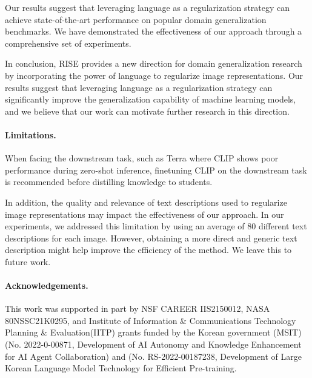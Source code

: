 \documentclass[10pt,twocolumn,letterpaper]{article}
\newcommand{\name}{{\color{black} RISE}}
\begin{document}
Our results suggest that leveraging language as a regularization strategy can achieve state-of-the-art performance on popular domain generalization benchmarks. We have demonstrated the effectiveness of our approach through a comprehensive set of experiments. 

In conclusion, \name{} provides a new direction for domain generalization research by incorporating the power of language to regularize image representations. Our results suggest that leveraging language as a regularization strategy can significantly improve the generalization capability of machine learning models, and we believe that our work can motivate further research in this direction.

\vspace{-10pt}
\paragraph{Limitations.} When facing the downstream task, such as Terra where CLIP shows poor performance during zero-shot inference, finetuning CLIP on the downstream task is recommended before distilling knowledge to students.

In addition, the quality and relevance of text descriptions used to regularize image representations may impact the effectiveness of our approach. In our experiments, we addressed this limitation by using an average of 80 different text descriptions for each image.  However, obtaining a more direct and generic text description might help improve the efficiency of the method.  We leave this to future work. 
\vspace{-10pt}
\paragraph{Acknowledgements.}
This work was supported in part by NSF CAREER IIS2150012, NASA 80NSSC21K0295, and Institute of Information \& Communications Technology Planning \& Evaluation(IITP) grants funded by the Korean government (MSIT) (No. 2022-0-00871, Development of AI Autonomy and Knowledge Enhancement for AI Agent Collaboration) and (No. RS-2022-00187238, Development of Large Korean Language Model Technology for Efficient Pre-training.

{\small


}
\end{document}
